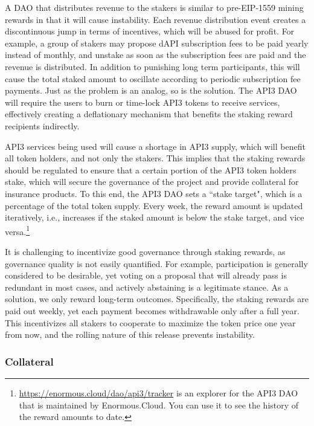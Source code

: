 \documentclass[11pt]{article}
\begin{document}
A DAO that distributes revenue to the stakers is similar to pre-EIP-1559 mining rewards in that it will cause instability.
Each revenue distribution event creates a discontinuous jump in terms of incentives, which will be abused for profit.
For example, a group of stakers may propose dAPI subscription fees to be paid yearly instead of monthly, and unstake as soon as the subscription fees are paid and the revenue is distributed.
In addition to punishing long term participants, this will cause the total staked amount to oscillate according to periodic subscription fee payments.
Just as the problem is an analog, so is the solution.
The API3 DAO will require the users to burn or time-lock API3 tokens to receive services, effectively creating a deflationary mechanism that benefits the staking reward recipients indirectly.

API3 services being used will cause a shortage in API3 supply, which will benefit all token holders, and not only the stakers.
This implies that the staking rewards should be regulated to ensure that a certain portion of the API3 token holders stake, which will secure the governance of the project and provide collateral for insurance products.
To this end, the API3 DAO sets a ``stake target", which is a percentage of the total token supply.
Every week, the reward amount is updated iteratively, i.e., increases if the staked amount is below the stake target, and vice versa.\footnote{\url{https://enormous.cloud/dao/api3/tracker} is an explorer for the API3 DAO that is maintained by Enormous.Cloud. You can use it to see the history of the reward amounts to date.}

It is challenging to incentivize good governance through staking rewards, as governance quality is not easily quantified.
For example, participation is generally considered to be desirable, yet voting on a proposal that will already pass is redundant in most cases, and actively abstaining is a legitimate stance.
As a solution, we only reward long-term outcomes.
Specifically, the staking rewards are paid out weekly, yet each payment becomes withdrawable only after a full year.
This incentivizes all stakers to cooperate to maximize the token price one year from now, and the rolling nature of this release prevents instability.

\subsubsection{Collateral}
\label{sec:collateral}
\end{document}
